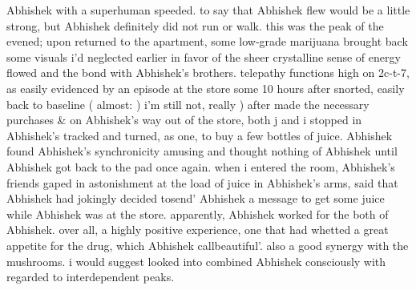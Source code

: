 \documentclass[12pt]{book}
\begin{document}
Abhishek with a superhuman speeded. to say that Abhishek flew would be a little strong, but Abhishek definitely did not run or walk. this was the peak of the evened; upon returned to the apartment, some low-grade marijuana brought back some visuals i'd neglected earlier in favor of the sheer crystalline sense of energy flowed and the bond with Abhishek's brothers. telepathy functions high on 2c-t-7, as easily evidenced by an episode at the store some 10 hours after snorted, easily back to baseline ( almost: ) i'm still not, really ) after made the necessary purchases \& on Abhishek's way out of the store, both j and i stopped in Abhishek's tracked and turned, as one, to buy a few bottles of juice. Abhishek found Abhishek's synchronicity amusing and thought nothing of Abhishek until Abhishek got back to the pad once again. when i entered the room, Abhishek's friends gaped in astonishment at the load of juice in Abhishek's arms, said that Abhishek had jokingly decided tosend' Abhishek a message to get some juice while Abhishek was at the store. apparently, Abhishek worked for the both of Abhishek. over all, a highly positive experience, one that had whetted a great appetite for the drug, which Abhishek callbeautiful'. also a good synergy with the mushrooms. i would suggest looked into combined Abhishek consciously with regarded to interdependent peaks.
\end{document}
